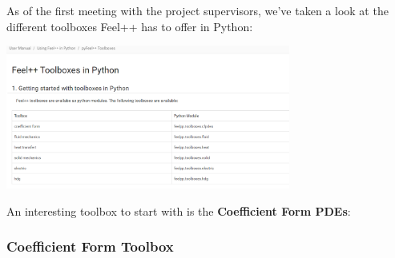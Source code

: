 \documentclass[12pt]{article}
\begin{document}
As of the first meeting with the project supervisors, we've taken a look at the different toolboxes Feel++ has to offer in Python:
\begin{frame}{}
    \begin{center}
        \includegraphics[width=0.7\textwidth]{images/pyfeelpptoolboxes.png}
    \end{center}
\end{frame}

An interesting toolbox to start with is the \textbf{Coefficient Form PDEs}:

\subsubsection{Coefficient Form Toolbox}
\end{document}
